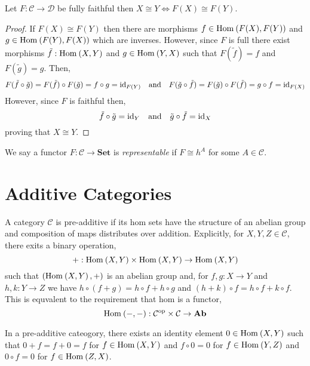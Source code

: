 \documentclass[12pt]{article}
\newcommand{\C}{\mathcal{C}}
\newcommand{\D}{\mathcal{D}}
\newcommand{\Set}{\mathbf{Set}}
\newcommand{\Ab}{\mathbf{Ab}}
\begin{document}
\begin{lemma}
Let $F : \C \to \D$ be fully faithful then $X \cong Y \iff F(X) \cong F(Y)$.
\end{lemma}

\begin{proof}
If $F(X) \cong F(Y)$ then there are morphisms $f \in \mathrm{Hom}_{} \left( F(X), F(Y) \right)$ and $g \in \mathrm{Hom}_{} \left( F(Y), F(X) \right)$ which are inverses. However, since $F$ is full there exist morphisms $\tilde{f} : \mathrm{Hom}_{} \left( X, Y \right)$ and $g \in \mathrm{Hom}_{} \left( Y, X \right)$ such that $F(\tilde{f}) = f$ and $F(\tilde{g}) = g$. Then,
\[ F(\tilde{f} \circ \tilde{g}) = F(\tilde{f}) \circ F(\tilde{g}) = f \circ g = \mathrm{id}_{F(Y)} \quad \text{and} \quad F(\tilde{g} \circ \tilde{f}) = F(\tilde{g}) \circ F(\tilde{f}) = g \circ f = \mathrm{id}_{F(X)} \]
However, since $F$ is faithful then,
\[ \tilde{f} \circ \tilde{g} = \mathrm{id}_Y \quad \text{and} \quad \tilde{g} \circ \tilde{f} = \mathrm{id}_X \]
proving that $X \cong Y$. 
\end{proof}

\begin{definition}
We say a functor $F : \C \to \Set$ is \textit{representable} if $F \cong h^A$ for some $A \in \C$. 
\end{definition}

\section{Additive Categories}

\begin{definition}
A category $\mathcal{C}$ is pre-additive if its hom sets have the structure of an abelian group and composition of maps distributes over addition. Explicitly, for $X, Y, Z \in \mathcal{C}$, there exits a binary operation,
\[ + :  \mathrm{Hom}_{} \left( X, Y \right) \times \mathrm{Hom}_{} \left( X, Y \right) \to \mathrm{Hom}_{} \left( X, Y \right)\]
such that $(\mathrm{Hom}_{} \left( X, Y \right), +)$ is an abelian group and, for $f, g : X \to Y$ and $h, k : Y \to Z$ we have $h \circ (f + g) = h \circ f + h \circ g$ and $(h + k) \circ f = h \circ f + k \circ f$. This is equvalent to the requirement that hom is a functor,
\[ \Hom{}{-}{-} : \mathcal{C}^{\mathrm{op}} \times \mathcal{C} \to \Ab \]
\end{definition}

\begin{lemma}
In a pre-additive cateogory, there exists an identity element $0 \in \mathrm{Hom}_{} \left( X, Y \right)$ such that $0 + f = f + 0 = f$ for $f \in \mathrm{Hom}_{} \left( X, Y \right)$ and $f \circ 0 = 0$ for $f \in \mathrm{Hom}_{} \left( Y, Z \right)$ and $0 \circ f = 0$ for $f \in \mathrm{Hom}_{} \left( Z, X \right)$.  
\end{lemma}
\end{document}

